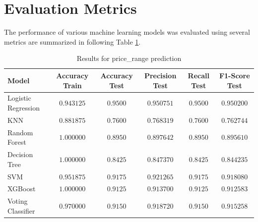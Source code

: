 \documentclass[12pt]{report}
\begin{document}
\section{Evaluation Metrics}
The performance of various machine learning models was evaluated using several metrics are summarized in following Table \ref{table:model_performance}.

\begin{table}[H]
\centering
\begin{tabular}{lccccc}
\toprule
\textbf{Model} & \textbf{Accuracy Train} & \textbf{Accuracy Test} & \textbf{Precision Test} & \textbf{Recall Test} & \textbf{F1-Score Test} \\
\toprule
Logistic Regression & $0.943125$ & $0.9500$ & $0.950751$ & $0.9500$ & $0.950200$ \\
\midrule
KNN & $0.881875$ & $0.7600$ & $0.768319$ & $0.7600$ & $0.762744$ \\
\midrule
Random Forest & $1.000000$ & $0.8950$ & $0.897642$ & $0.8950$ & $0.895610$ \\
\midrule
Decision Tree & $1.000000$ & $0.8425$ & $0.847370$ & $0.8425$ & $0.844235$ \\
\midrule
SVM & $0.951875$ & $0.9175$ & $0.921265$ & $0.9175$ & $0.918080$ \\
\midrule
XGBoost & $1.000000$ & $0.9125$ & $0.913700$ & $0.9125$ & $0.912583$ \\
\midrule
Voting Classifier & $0.970000$ & $0.9150$ & $0.918720$ & $0.9150$ & $0.915258$ \\
\bottomrule
\end{tabular}
\caption{Results for price\_range prediction}
\label{table:model_performance}
\end{table}
\end{document}
